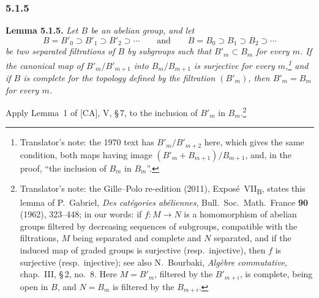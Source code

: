 
\subsubsection*{5.1.5}
\label{sga3:VIIB:5.1.5}

\medskip
\noindent\textbf{Lemma 5.1.5.}
\label{sga3:VIIB:5.1.5:filtered-groups-lemma}
{\itshape Let \(B\) be an abelian group, and let
\[
  B=B'_0\supset B'_1\supset B'_2\supset\cdots
  \qquad\text{and}\qquad
  B=B_0\supset B_1\supset B_2\supset\cdots
\]
be two separated filtrations of \(B\) by subgroups such that
\(B'_m\subset B_m\) for every \(m\). If the canonical map of
\(B'_m/B'_{m+1}\) into \(B_m/B_{m+1}\) is surjective for every \(m\),\footnote{Translator's
note: the 1970 text has \(B'_m/B'_{m+2}\) here, which gives the same condition, both maps having image
\((B'_m+B_{m+1})/B_{m+1}\), and, in the proof, ``the inclusion of \(B_m\) in \(B_m\)''.}
and if \(B\) is complete for the topology defined by the filtration
\((B'_m)\), then \(B'_m=B_m\) for every \(m\).}

Apply Lemma~1 of \textup{[CA]}, V, \S\,7, to the inclusion of
\(B'_m\) in \(B_m\).\footnote{Translator's note: the Gille--Polo re-edition (2011),
Expos\'e~VII\textsubscript{B}, states this lemma of P.~Gabriel, \emph{Des cat\'egories ab\'eliennes},
Bull.\ Soc.\ Math.\ France \textbf{90} (1962), 323--448; in our words: if \(f:M\to N\) is a homomorphism of
abelian groups filtered by decreasing sequences of subgroups, compatible with the filtrations, \(M\) being
separated and complete and \(N\) separated, and if the induced map of graded groups is surjective (resp.\
injective), then \(f\) is surjective (resp.\ injective); see also N.~Bourbaki, \emph{Alg\`ebre commutative},
chap.~III, \S\,2, no.~8. Here \(M=B'_m\), filtered by the \(B'_{m+i}\), is complete, being open in \(B\),
and \(N=B_m\) is filtered by the \(B_{m+i}\).}

